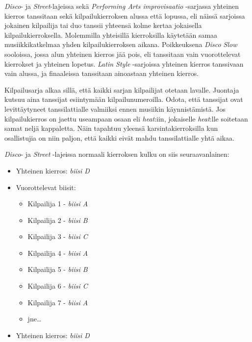 \documentclass[12pt, a4paper, oneside]{article}
\begin{document}
\textit{Disco}- ja \textit{Street}-lajeissa sekä \textit{Performing Arts improvisaatio} -sarjassa yhteinen kierros tanssitaan sekä kilpailukierroksen alussa että lopussa,
eli näissä sarjoissa jokainen kilpailija tai duo tanssii yhteensä kolme kertaa jokaisella kilpailukierroksella.
Molemmilla yhteisillä kierroksilla käytetään samaa musiikkikatkelmaa yhden kilpailukierroksen aikana.
Poikkeuksena \textit{Disco Slow} sooloissa,
jossa alun yhteinen kierros jää pois,
eli tanssitaan vain vuorottelevat kierrokset ja yhteinen lopetus.
\textit{Latin Style} -sarjoissa yhteinen kierros tanssivaan vain alussa,
ja finaaleissa tanssitaan ainoastaan yhteinen kierros.

Kilpailusarja alkaa sillä,
että kaikki sarjan kilpailijat otetaan lavalle.
Juontaja kutsuu aina tanssijat esiintymään kilpailunumeroilla.
Odota, että tanssijat ovat levittäytyneet tanssilattialle valmiiksi ennen musiikin käynnistämistä.
Jos kilpailukierros on jaettu useampaan osaan eli \textit{heat}:iin,
jokaiselle \textit{heat}:lle soitetaan samat neljä kappaletta.
Näin tapahtuu yleensä karsintakierroksilla kun osallistujia on niin paljon,
että kaikki eivät mahdu tanssilattialle yhtä aikaa.

\textit{Disco}- ja \textit{Street} -lajeissa normaali kierroksen kulku on siis seuraavanlainen:

\begin{itemize}[nosep]
    \item Yhteinen kierros: \textit{biisi D}
    \item Vuorottelevat biisit:
        \begin{itemize}
            \item Kilpailija 1 - \textit{biisi A}
            \item Kilpailija 2 - \textit{biisi B}
            \item Kilpailija 3 - \textit{biisi C}
            \item Kilpailija 4 - \textit{biisi A}
            \item Kilpailija 5 - \textit{biisi B}
            \item Kilpailija 6 - \textit{biisi C}
            \item Kilpailija 7 - \textit{biisi A}
            \item jne\ldots
        \end{itemize}
    \item Yhteinen kierros: \textit{biisi D}
\end{itemize}
\end{document}
